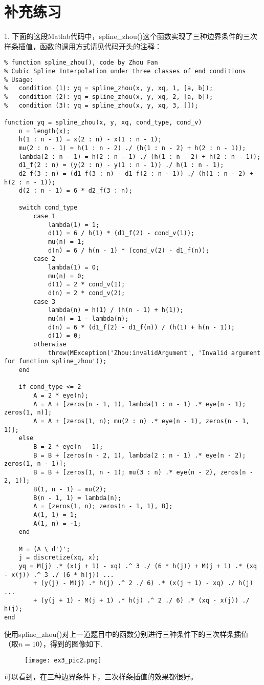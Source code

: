 \documentclass[12pt, a4paper]{article}
\theoremstyle{margin}
\begin{document}
\section{补充练习}

1. 下面的这段Matlab代码中，spline\_zhou()这个函数实现了三种边界条件的三次样条插值，函数的调用方式请见代码开头的注释：
\begin{lstlisting}
% function spline_zhou(), code by Zhou Fan
% Cubic Spline Interpolation under three classes of end conditions
% Usage:
%   condition (1): yq = spline_zhou(x, y, xq, 1, [a, b]);
%   condition (2): yq = spline_zhou(x, y, xq, 2, [a, b]);
%   condition (3): yq = spline_zhou(x, y, xq, 3, []);

function yq = spline_zhou(x, y, xq, cond_type, cond_v)
    n = length(x);
    h(1 : n - 1) = x(2 : n) - x(1 : n - 1);
    mu(2 : n - 1) = h(1 : n - 2) ./ (h(1 : n - 2) + h(2 : n - 1));
    lambda(2 : n - 1) = h(2 : n - 1) ./ (h(1 : n - 2) + h(2 : n - 1));
    d1_f(2 : n) = (y(2 : n) - y(1 : n - 1)) ./ h(1 : n - 1);
    d2_f(3 : n) = (d1_f(3 : n) - d1_f(2 : n - 1)) ./ (h(1 : n - 2) + h(2 : n - 1));
    d(2 : n - 1) = 6 * d2_f(3 : n);
    
    switch cond_type
        case 1
            lambda(1) = 1;
            d(1) = 6 / h(1) * (d1_f(2) - cond_v(1));
            mu(n) = 1;
            d(n) = 6 / h(n - 1) * (cond_v(2) - d1_f(n));
        case 2
            lambda(1) = 0;
            mu(n) = 0;
            d(1) = 2 * cond_v(1);
            d(n) = 2 * cond_v(2);
        case 3
            lambda(n) = h(1) / (h(n - 1) + h(1));
            mu(n) = 1 - lambda(n);
            d(n) = 6 * (d1_f(2) - d1_f(n)) / (h(1) + h(n - 1));
            d(1) = 0;
        otherwise
            throw(MException('Zhou:invalidArgument', 'Invalid argument for function spline_zhou'));
    end
    
    if cond_type <= 2
        A = 2 * eye(n);
        A = A + [zeros(n - 1, 1), lambda(1 : n - 1) .* eye(n - 1); zeros(1, n)];
        A = A + [zeros(1, n); mu(2 : n) .* eye(n - 1), zeros(n - 1, 1)];
    else
        B = 2 * eye(n - 1);
        B = B + [zeros(n - 2, 1), lambda(2 : n - 1) .* eye(n - 2); zeros(1, n - 1)];
        B = B + [zeros(1, n - 1); mu(3 : n) .* eye(n - 2), zeros(n - 2, 1)];
        B(1, n - 1) = mu(2);
        B(n - 1, 1) = lambda(n);
        A = [zeros(1, n); zeros(n - 1, 1), B];
        A(1, 1) = 1;
        A(1, n) = -1;
    end
    
    M = (A \ d')';
    j = discretize(xq, x);
    yq = M(j) .* (x(j + 1) - xq) .^ 3 ./ (6 * h(j)) + M(j + 1) .* (xq - x(j)) .^ 3 ./ (6 * h(j)) ...
        + (y(j) - M(j) .* h(j) .^ 2 ./ 6) .* (x(j + 1) - xq) ./ h(j) ...
        + (y(j + 1) - M(j + 1) .* h(j) .^ 2 ./ 6) .* (xq - x(j)) ./ h(j);
end
\end{lstlisting}
使用spline\_zhou()对上一道题目中的函数分别进行三种条件下的三次样条插值（取$n=10$），得到的图像如下.
\begin{figure}[H]
  \begin{center}
    \texttt{[image: ex3\_pic2.png]}
  \end{center}
\end{figure}
可以看到，在三种边界条件下，三次样条插值的效果都很好。
\end{document}
